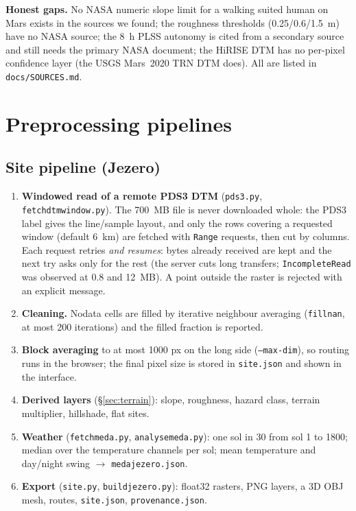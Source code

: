 \documentclass[11pt,a4paper]{article}
\renewcommand{\_}{\textunderscore\allowbreak}
\newcommand{\code}[1]{\texttt{#1}}
\begin{document}
\textbf{Honest gaps.} No NASA numeric slope limit for a walking suited human on Mars exists in the sources we found; the roughness thresholds (0.25/0.6/1.5~m) have no NASA source; the 8~h PLSS autonomy is cited from a secondary source and still needs the primary NASA document; the HiRISE DTM has no per-pixel confidence layer (the USGS Mars~2020 TRN DTM does). All are listed in \code{docs/SOURCES.md}.

\section{Preprocessing pipelines}
\subsection{Site pipeline (Jezero)}
\begin{enumerate}
\item \textbf{Windowed read of a remote PDS3 DTM} (\code{pds3.py}, \code{fetch\_dtm\_window.py}). The 700~MB file is never downloaded whole: the PDS3 label gives the line/sample layout, and only the rows covering a requested window (default 6~km) are fetched with \code{Range} requests, then cut by columns. Each request retries \emph{and resumes}: bytes already received are kept and the next try asks only for the rest (the server cuts long transfers; \code{IncompleteRead} was observed at 0.8 and 12~MB). A point outside the raster is rejected with an explicit message.
\item \textbf{Cleaning.} Nodata cells are filled by iterative neighbour averaging (\code{fill\_nan}, at most 200 iterations) and the filled fraction is reported.
\item \textbf{Block averaging} to at most 1000 px on the long side (\code{--max-dim}), so routing runs in the browser; the final pixel size is stored in \code{site.json} and shown in the interface.
\item \textbf{Derived layers} (\S\ref{sec:terrain}): slope, roughness, hazard class, terrain multiplier, hillshade, flat sites.
\item \textbf{Weather} (\code{fetch\_meda.py}, \code{analyse\_meda.py}): one sol in 30 from sol 1 to 1800; median over the temperature channels per sol; mean temperature and day/night swing $\to$ \code{meda\_jezero.json}.
\item \textbf{Export} (\code{site.py}, \code{build\_jezero.py}): float32 rasters, PNG layers, a 3D OBJ mesh, routes, \code{site.json}, \code{provenance.json}.
\end{enumerate}
\end{document}
